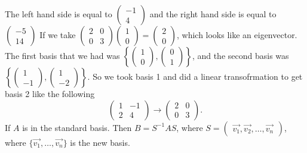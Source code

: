     The left hand side is equal to $\begin{pmatrix} -1\\4 \end{pmatrix}$ and the right hand side is equal to $\begin{pmatrix} -5\\14 \end{pmatrix}$ If we take $\begin{pmatrix} 2&0\\0&3 \end{pmatrix} \begin{pmatrix} 1\\0 \end{pmatrix} =\begin{pmatrix} 2\\0 \end{pmatrix} $, which looks like an eigenvector. The first basis that we had was $\left\{\begin{pmatrix} 1\\0 \end{pmatrix}, \begin{pmatrix} 0\\1 \end{pmatrix}  \right\}$, and the second basis was $\left\{\begin{pmatrix} 1\\-1 \end{pmatrix}, \begin{pmatrix} 1\\-2 \end{pmatrix}  \right\}$. So we took basis 1 and did a linear transofrmation to get basis 2 like the following 
    \[
    \begin{pmatrix} 1&-1\\2&4 \end{pmatrix} \to \begin{pmatrix} 2&0\\0&3 \end{pmatrix} 
    .\] If $A$ is in the standard basis. Then $B=S^{-1}AS$, where $S=\begin{pmatrix} \vec{v_1},\vec{v_2},\ldots,\vec{v_{n}} \end{pmatrix} $, where $\{\vec{v_1},\ldots,\vec{v_n}\}$ is the new basis.
